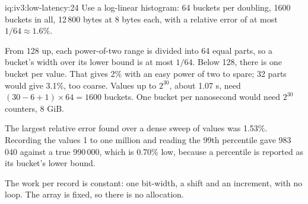 \begin{solution}{iq:iv3:low-latency:24}
Use a log-linear histogram: 64 buckets per doubling, 1600 buckets in all, 12\,800 bytes at 8 bytes each, with a relative error of at most $1/64 \approx 1.6\%$.

From 128 up, each power-of-two range is divided into 64 equal parts, so a bucket's width over its lower bound is at most $1/64$. Below 128, there is one bucket per value. That gives 2\% with an easy power of two to spare; 32 parts would give 3.1\%, too coarse. Values up to $2^{30}$, about 1.07 s, need $(30 - 6 + 1) \times 64 = 1600$ buckets. One bucket per nanosecond would need $2^{30}$ counters, 8 GiB.
\label{lst:iv3:ll:hist}

The largest relative error found over a dense sweep of values was 1.53\%. Recording the values 1 to one million and reading the 99th percentile gave 983\,040 against a true 990\,000, which is 0.70\% low, because a percentile is reported as its bucket's lower bound.

The work per record is constant: one bit-width, a shift and an increment, with no loop. The array is fixed, so there is no allocation.

\end{solution}

